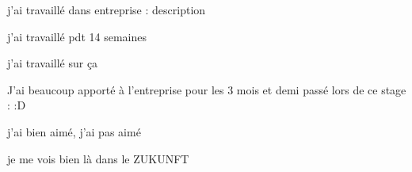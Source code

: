 
j'ai travaillé dans entreprise : description

j'ai travaillé pdt 14 semaines

j'ai travaillé sur ça

J'ai beaucoup apporté à l'entreprise pour les 3 mois et demi passé lors de ce stage : :D

j'ai bien aimé, j'ai pas aimé

je me vois bien là dans le ZUKUNFT
